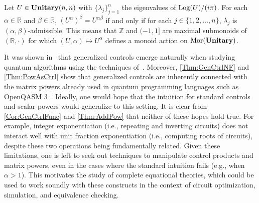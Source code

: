 \begin{theorem}
    \label{Thm:AddPow}
    Let $U \in \mathbf{Unitary}( n, n )$ with $\{ \lambda_j \}_{j=1}^{n}$ the eigenvalues of $\operatorname{Log}( U ) / (i\pi)$.
    For each $\alpha \in \mathbb{R}$ and $\beta \in \mathbb{R}$, $( U^\alpha )^\beta = U^{\alpha \beta}$ if and only if for each $j \in \{ 1, 2, \ldots, n \}$, $\lambda_j$ is $( \alpha, \beta )$-admissible.
    This means that $\mathbb{Z}$ and $( -1, 1 ]$ are maximal submonoids of $( \mathbb{R}, \cdot )$ for which $( U, \alpha ) \mapsto U^\alpha$ defines a monoid action on $\operatorname{Mor}( \mathbf{Unitary} )$.
\end{theorem}

It was shown in~\cite{Schober2024} that generalized controls emerge naturally when studying quantum algorithms using the techniques of~\cite{Gidney2017}.
Moreover, \cref{Thm:GenCtrlNF} and \cref{Thm:PowAsCtrl} show that generalized controls are inherently connected with the matrix powers already used in quantum programming languages such as OpenQASM 3~\cite{Cross2022}.
Ideally, one would hope that the intuition for standard controls and scalar powers would generalize to this setting.
It is clear from \cref{Cor:GenCtrlFunc} and \cref{Thm:AddPow} that neither of these hopes hold true.
For example, integer exponentiation (i.e., repeating and inverting circuits) does not interact well with unit fraction exponentiation (i.e., computing roots of circuits), despite these two operations being fundamentally related.
Given these limitations, one is left to seek out techniques to manipulate control products and matrix powers, even in the cases where the standard intuition fails (e.g., when $\alpha > 1$).
This motivates the study of complete equational theories, which could be used to work soundly with these constructs in the context of circuit optimization, simulation, and equivalence checking.

